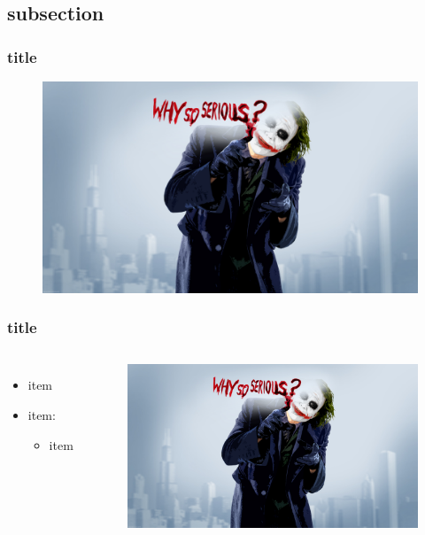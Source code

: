 \documentclass[10pt]{beamer}
\begin{document}
\subsection{subsection}
\begin{frame}
\frametitle{title}
\begin{figure}[ht]
  \centering
  \includegraphics[scale=0.05]{figures/joker.jpg}
\end{figure}
\end{frame}

\begin{frame}
\frametitle{title}
\begin{columns}[c]
\begin{itemize}
\item item
\item item:
\begin{itemize}
\item item
\end{itemize}
\end{itemize}
\begin{figure}[ht]
\includegraphics[scale=0.08]{figures/joker.jpg}
\end{figure}
\end{columns}
\end{frame}
\end{document}
